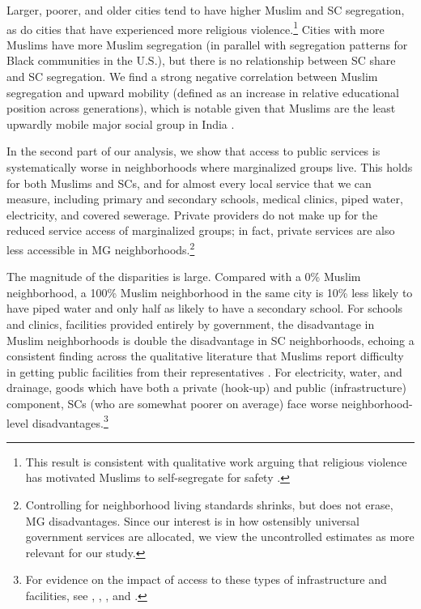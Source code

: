 \documentclass[12pt]{article}
\begin{document}
Larger, poorer, and older cities tend to have higher Muslim and SC segregation, as do cities that have experienced more religious violence.\footnote{This result is consistent with qualitative work arguing that religious violence has motivated Muslims to self-segregate for safety \citep{jaffrelot2012}.}  Cities with more Muslims have more Muslim segregation (in parallel with segregation patterns for Black communities in the U.S.), but there is no relationship between SC share and SC segregation. We find a strong negative correlation between Muslim segregation and upward mobility (defined as an increase in relative educational position across generations), which is notable given that Muslims are the least upwardly mobile major social group in India \citep{anr2022mob}.

In the second part of our analysis, we show that access to public services is systematically worse in neighborhoods where marginalized groups live. This holds for both Muslims and SCs, and for almost every local service that we can measure, including primary and secondary schools, medical clinics, piped water, electricity, and covered sewerage. Private providers do not make up for the reduced service access of marginalized groups; in fact, private services are also less accessible in MG neighborhoods.\footnote{Controlling for neighborhood living standards shrinks, but does not erase, MG disadvantages. Since our interest is in how ostensibly universal government services are allocated, we view the uncontrolled estimates as more relevant for our study.}

The magnitude of the disparities is large. Compared with a 0\% Muslim neighborhood, a 100\% Muslim neighborhood in the same city is 10\% less likely to have piped water and only half as likely to have a secondary school. For schools and clinics, facilities provided entirely by government, the disadvantage in Muslim neighborhoods is double the disadvantage in SC neighborhoods, echoing a consistent finding across the qualitative literature that Muslims report difficulty in getting public facilities from their representatives \citep{jaffrelot2012}. For electricity, water, and drainage, goods which have both a private (hook-up) and public (infrastructure) component, SCs (who are somewhat poorer on average) face worse neighborhood-level disadvantages.\footnote{For evidence on the impact of access to these types of infrastructure and facilities, see \citet{duflo2001}, \citet{chandra2007}, \citet{adukia2017}, and \citet{lee2020}.} 
\end{document}
